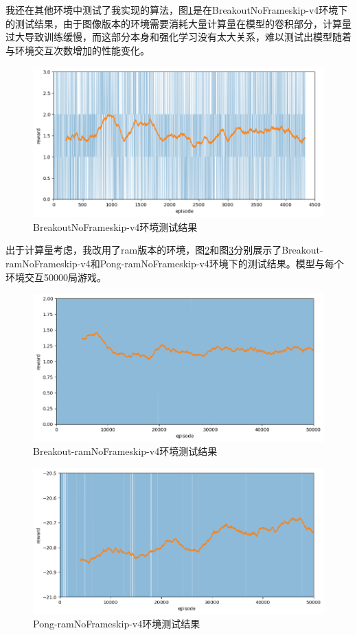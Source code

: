 \documentclass{article}
\begin{document}
我还在其他环境中测试了我实现的算法，图\ref{fig:rainbow-breakout-cv}是在BreakoutNoFrameskip-v4环境下的测试结果，由于图像版本的环境需要消耗大量计算量在模型的卷积部分，计算量过大导致训练缓慢，而这部分本身和强化学习没有太大关系，难以测试出模型随着与环境交互次数增加的性能变化。

\begin{figure}[htbp]
	\centering
	\includegraphics[width=0.9\linewidth]{fig-rainbow-breakout-cv.png}
	\caption{BreakoutNoFrameskip-v4环境测试结果}
	\label{fig:rainbow-breakout-cv}
\end{figure}

出于计算量考虑，我改用了ram版本的环境，图\ref{fig:rainbow-breakout}和图\ref{fig:rainbow-pong}分别展示了Breakout-ramNoFrameskip-v4和Pong-ramNoFrameskip-v4环境下的测试结果。模型与每个环境交互50000局游戏。

\begin{figure}[htbp]
	\centering
	\includegraphics[width=0.9\linewidth]{fig-rainbow-breakout.png}
	\caption{Breakout-ramNoFrameskip-v4环境测试结果}
	\label{fig:rainbow-breakout}
\end{figure}

\begin{figure}[htbp]
	\centering
	\includegraphics[width=0.9\linewidth]{fig-rainbow-pong.png}
	\caption{Pong-ramNoFrameskip-v4环境测试结果}
	\label{fig:rainbow-pong}
\end{figure}
\end{document}
